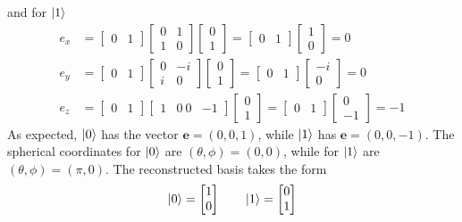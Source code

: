 \documentclass[../../../main.tex]{subfiles}
\begin{document}
and for $\ket{1}$
\begin{align*}
    e_x & =
    \begin{bmatrix} 0 & 1 \end{bmatrix}
    \begin{bmatrix} 0 & 1 \\ 1 & 0 \end{bmatrix}
    \begin{bmatrix} 0 \\ 1 \end{bmatrix} =
    \begin{bmatrix} 0 & 1 \end{bmatrix}
    \begin{bmatrix} 1 \\ 0 \end{bmatrix} = 0  \\
    e_y & =
    \begin{bmatrix} 0 & 1 \end{bmatrix}
    \begin{bmatrix} 0 & -i \\ i & 0 \end{bmatrix}
    \begin{bmatrix} 0 \\ 1 \end{bmatrix} =
    \begin{bmatrix} 0 & 1 \end{bmatrix}
    \begin{bmatrix} -i \\ 0 \end{bmatrix} = 0 \\
    e_z & =
    \begin{bmatrix} 0 & 1 \end{bmatrix}
    \begin{bmatrix} 1 & 0 \ 0 & -1 \end{bmatrix}
    \begin{bmatrix} 0 \\ 1 \end{bmatrix} =
    \begin{bmatrix} 0 & 1 \end{bmatrix}
    \begin{bmatrix} 0 \\ -1 \end{bmatrix} = -1
\end{align*}
As expected, $\ket{0}$ has the vector $\mathbf{e} = (0,0,1)$, while $\ket{1}$ has $\mathbf{e}=(0,0,-1)$.
The spherical coordinates for $\ket{0}$ are $(\theta,\phi)=(0,0)$, while for $\ket{1}$ are $(\theta,\phi)=(\pi,0)$.
The reconstructed basis takes the form
\begin{equation*}
    \ket{0}= \begin{bmatrix}
        1 \\0
    \end{bmatrix}
    \qquad
    \ket{1} = \begin{bmatrix}
        0 \\1
    \end{bmatrix}
\end{equation*}
\end{document}
